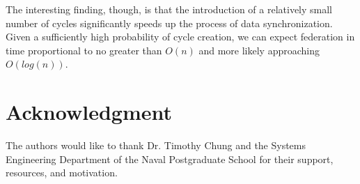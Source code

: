 \documentclass[10pt]{./IEEEtran}
\begin{document}
The interesting finding, though, is that the introduction of a relatively small number of cycles significantly speeds up the process of data synchronization\cite{Watts:1998}.  Given a sufficiently high probability of cycle creation, we can expect federation in time proportional to no greater than $O(n)$ and more likely approaching $O(log(n))$.


\newpage
\section*{Acknowledgment}
The authors would like to thank Dr. Timothy Chung and the Systems Engineering Department of the Naval Postgraduate School for their support, resources, and motivation.




\end{document}
